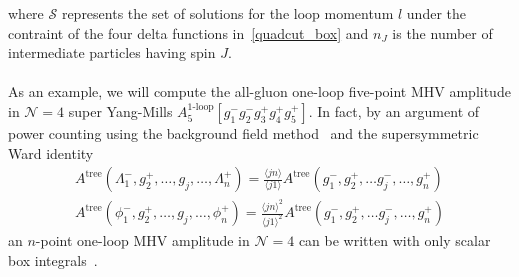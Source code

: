 where $\mathcal{S}$ represents the set of solutions for the loop momentum $l$ under the contraint of the four delta functions in~\cref{quadcut_box} and $n_J$ is the number of intermediate particles having spin $J$.
\\\\
As an example, we will compute the all-gluon one-loop five-point MHV amplitude in $\mathcal{N} = 4$ super Yang-Mills $A_5^{\textrm{1-loop}}[g_1^- g_2^- g_3^+ g_4^+ g_5^+]$. 
In fact, by an argument of power counting using the background field method~\cite{Gates:1983nr} and the supersymmetric Ward identity\begin{equation}\label{super_wi}
\begin{split}
A^{\mathrm{tree}}(\Lambda_1^-, g_2^+, \ldots, g_j, \ldots, \Lambda_n^+)
= \frac{\langle jn \rangle}{\langle j 1 \rangle}
A^{\mathrm{tree}}(g_1^-, g_2^+, \ldots g_j^-, \ldots , g_n^+)
\\
A^{\mathrm{tree}}(\phi_1^-, g_2^+, \ldots, g_j, \ldots, \phi_n^+)
= \frac{\langle jn \rangle^2}{\langle j 1 \rangle^2}
A^{\mathrm{tree}}(g_1^-, g_2^+, \ldots g_j^-, \ldots , g_n^+)
\end{split}
\end{equation}
an $n$-point one-loop MHV amplitude in $\mathcal{\mathcal{N}} = 4$ can be written with only scalar box integrals~\cite{Bern:1994zx}.